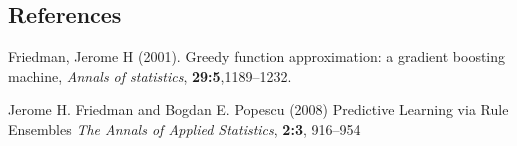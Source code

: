 \documentclass[12pt]{article}
\begin{document}
%
%
%

\subsection*{References}

\begin{description}


\item
Friedman, Jerome H (2001).
Greedy function approximation: a gradient boosting machine,
\textit{Annals of statistics},
\textbf{29:5},1189--1232.


\item Jerome H. Friedman and Bogdan E. Popescu (2008)
Predictive Learning via Rule Ensembles
\textit{The Annals of Applied Statistics},
\textbf{2:3}, 916--954


\end{description}
\end{document}
